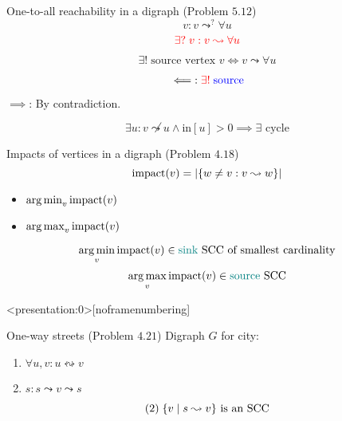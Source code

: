\begin{frame}{}
  \begin{exampleblock}{One-to-all reachability in a digraph (Problem $5.12$)}
    \[
      v: v \leadsto^{?} \forall u
    \]
    \[
      \textcolor{red}{\exists?\; v: v \leadsto \forall u}
    \]
  \end{exampleblock}

  \pause
  \vspace{0.60cm}
  \centerline{}

  \[
    \exists!\; \text{source vertex } v \iff v \leadsto \forall u
  \]

  \pause
  \[
    \impliedby: \textcolor{red}{\exists!}\; \textcolor{blue}{\text{source}}
  \]

  \pause
  \centerline{$\implies$: By contradiction.}
  \[
    \exists u: v \not\leadsto u \land \text{in}[u] > 0 \implies \exists \text{ cycle}
  \]
\end{frame}

\begin{frame}{}
  \begin{exampleblock}{Impacts of vertices in a digraph (Problem $4.18$)}
    \[
      \text{impact}(v) = |\{w \neq v: v \leadsto w\}|
    \]

    \begin{itemize}
      \centering
      \item $\operatorname*{arg\,min}_{v} \text{impact}(v)$
      \item $\operatorname*{arg\,max}_{v} \text{impact}(v)$
    \end{itemize}
  \end{exampleblock}

  \pause
  \[
    \operatorname*{arg\,min}_{v} \text{impact}(v) \in \text{\textcolor{teal}{sink} SCC of smallest cardinality}
  \]
  \pause
  \[
    \operatorname*{arg\,max}_{v} \text{impact}(v) \in \text{\textcolor{teal}{source} SCC}
  \]

  \pause
  \vspace{0.30cm}
  \centerline{}
\end{frame}

\begin{frame}<presentation:0>[noframenumbering]
  \begin{exampleblock}{One-way streets (Problem $4.21$)}
	Digraph $G$ for city:
    \begin{enumerate}
      \item $\forall u,v: u \leftrightsquigarrow v$
      \item $s: s \leadsto v \leadsto s$
    \end{enumerate}
  \end{exampleblock}

  \pause
  \[
	(2)\; \{v \mid s \leadsto v\} \text{ is an SCC}
  \]
\end{frame}

